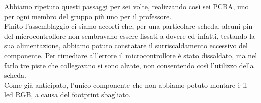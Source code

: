 \noindent Abbiamo ripetuto questi passaggi per sei volte, realizzando così sei PCBA, uno per ogni membro del gruppo più uno per il professore. \\
Finito l’assemblaggio ci siamo accorti che, per una particolare scheda, alcuni pin del microcontrollore non sembravano essere fissati a dovere ed infatti, testando la sua alimentazione, abbiamo potuto constatare il surriscaldamento eccessivo del componente. Per rimediare all’errore il microcontrollore è stato dissaldato, ma nel farlo tre piste che collegavano si sono alzate, non consentendo così l’utilizzo della scheda. \\
Come già anticipato, l’unico componente che non abbiamo potuto montare è il led RGB, a causa del footprint sbagliato.
